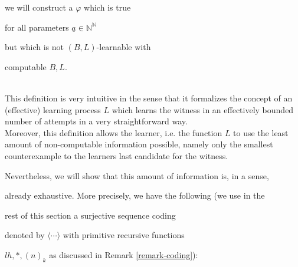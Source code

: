 \documentclass[1p]{elsarticle}
\newcommand{\NN}{\ensuremath{\mathbb{N}}}
\theoremstyle{plain}
\theoremstyle{definition}
\theoremstyle{remark}
\theoremstyle{definition}
\begin{document}
we will construct a $\varphi$ which is true 

for all parameters $\underline{a}\in\NN^{\NN}$ 

but which is not $(B,L)$-learnable with 

computable $B,L.$ 

\\[1mm] 

This definition is very intuitive in the sense that it formalizes the concept of an (effective) learning process $L$ which learns the witness in an effectively bounded number of attempts in a very straightforward way.\\

Moreover, this definition allows the learner, i.e. the function $L$ to use the least amount of non-computable information possible, namely only the smallest counterexample to the learners last candidate for the witness. 

Nevertheless, we will show that this amount of information is, in a sense, 

already exhaustive. More precisely, we have the following (we use in the 

rest of this section a surjective sequence coding 

denoted by $\langle\cdots\rangle$ with primitive recursive functions 

$lh,*,(n)_k$ as discussed in Remark \ref{remark-coding}):
\end{document}
